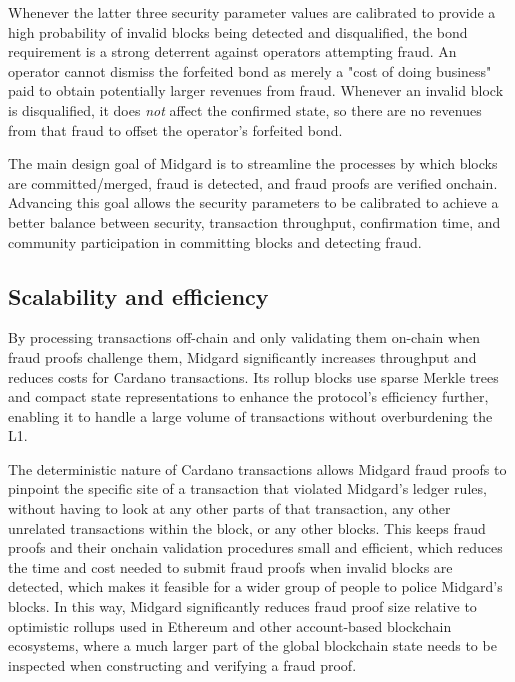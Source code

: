 \documentclass[../midgard.tex]{subfiles}
\begin{document}
Whenever the latter three security parameter values are calibrated to provide a high probability of invalid blocks being detected and disqualified, the bond requirement is a strong deterrent against operators attempting fraud.
An operator cannot dismiss the forfeited bond as merely a "cost of doing business" paid to obtain potentially larger revenues from fraud.
Whenever an invalid block is disqualified, it does \emph{not} affect the confirmed state, so there are no revenues from that fraud to offset the operator's forfeited bond.

The main design goal of Midgard is to streamline the processes by which blocks are committed/merged, fraud is detected, and fraud proofs are verified onchain.
Advancing this goal allows the security parameters to be calibrated to achieve a better balance between security, transaction throughput, confirmation time, and community participation in committing blocks and detecting fraud.

\subsection*{Scalability and efficiency}
\label{h:scalability-and-efficiency}

By processing transactions off-chain and only validating them on-chain when fraud proofs challenge them, Midgard significantly increases throughput and reduces costs for Cardano transactions.
Its rollup blocks use sparse Merkle trees and compact state representations to enhance the protocol's efficiency further, enabling it to handle a large volume of transactions without overburdening the L1.

The deterministic nature of Cardano transactions allows Midgard fraud proofs to pinpoint the specific site of a transaction that violated Midgard's ledger rules, without having to look at any other parts of that transaction, any other unrelated transactions within the block, or any other blocks.
This keeps fraud proofs and their onchain validation procedures small and efficient, which reduces the time and cost needed to submit fraud proofs when invalid blocks are detected, which makes it feasible for a wider group of people to police Midgard's blocks.
In this way, Midgard significantly reduces fraud proof size relative to optimistic rollups used in Ethereum and other account-based blockchain ecosystems, where a much larger part of the global blockchain state needs to be inspected when constructing and verifying a fraud proof.
\end{document}
